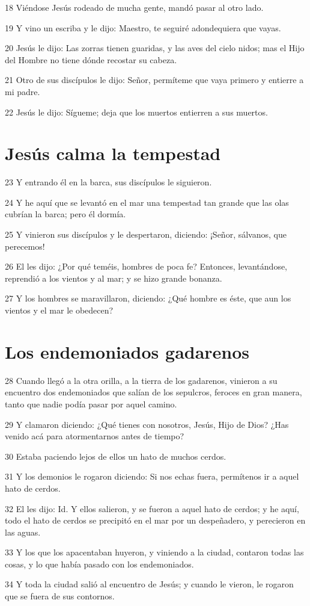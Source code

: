 \par 18 Viéndose Jesús rodeado de mucha gente, mandó pasar al otro lado.
\par 19 Y vino un escriba y le dijo: Maestro, te seguiré adondequiera que vayas.
\par 20 Jesús le dijo: Las zorras tienen guaridas, y las aves del cielo nidos; mas el Hijo del Hombre no tiene dónde recostar su cabeza.
\par 21 Otro de sus discípulos le dijo: Señor, permíteme que vaya primero y entierre a mi padre.
\par 22 Jesús le dijo: Sígueme; deja que los muertos entierren a sus muertos.

\section*{Jesús calma la tempestad}

\par 23 Y entrando él en la barca, sus discípulos le siguieron.
\par 24 Y he aquí que se levantó en el mar una tempestad tan grande que las olas cubrían la barca; pero él dormía.
\par 25 Y vinieron sus discípulos y le despertaron, diciendo: ¡Señor, sálvanos, que perecemos!
\par 26 El les dijo: ¿Por qué teméis, hombres de poca fe? Entonces, levantándose, reprendió a los vientos y al mar; y se hizo grande bonanza.
\par 27 Y los hombres se maravillaron, diciendo: ¿Qué hombre es éste, que aun los vientos y el mar le obedecen?

\section*{Los endemoniados gadarenos}

\par 28 Cuando llegó a la otra orilla, a la tierra de los gadarenos, vinieron a su encuentro dos endemoniados que salían de los sepulcros, feroces en gran manera, tanto que nadie podía pasar por aquel camino.
\par 29 Y clamaron diciendo: ¿Qué tienes con nosotros, Jesús, Hijo de Dios? ¿Has venido acá para atormentarnos antes de tiempo?
\par 30 Estaba paciendo lejos de ellos un hato de muchos cerdos.
\par 31 Y los demonios le rogaron diciendo: Si nos echas fuera, permítenos ir a aquel hato de cerdos.
\par 32 El les dijo: Id. Y ellos salieron, y se fueron a aquel hato de cerdos; y he aquí, todo el hato de cerdos se precipitó en el mar por un despeñadero, y perecieron en las aguas.
\par 33 Y los que los apacentaban huyeron, y viniendo a la ciudad, contaron todas las cosas, y lo que había pasado con los endemoniados.
\par 34 Y toda la ciudad salió al encuentro de Jesús; y cuando le vieron, le rogaron que se fuera de sus contornos.

